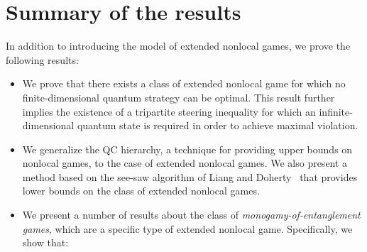 \section{Summary of the results}
In addition to introducing the model of extended nonlocal games, we prove the following results:

\begin{itemize}

	\item We prove that there exists a class of extended nonlocal game for which no finite-dimensional quantum strategy can be optimal. This result further implies the existence of a tripartite steering inequality for which an infinite-dimensional quantum state is required in order to achieve maximal violation. 

	\item We generalize the QC hierarchy, a technique for providing upper bounds on nonlocal games, to the case of extended nonlocal games. We also present a method based on the see-saw algorithm of Liang and Doherty~\cite{Liang2007} that provides lower bounds on the class of extended nonlocal games. 	


	\item We present a number of results about the class of \emph{monogamy-of-entanglement games}, which are a specific type of extended nonlocal game. Specifically, we show that: 
	

\end{itemize}
